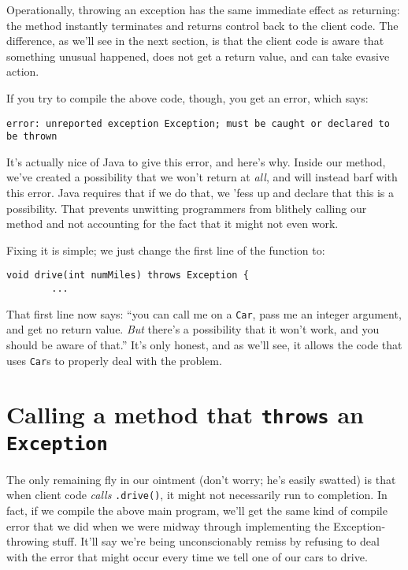 Operationally, throwing an exception has the same immediate effect as
returning: the method instantly terminates and returns control back to the
client code. The difference, as we'll see in the next section, is that the
client code is aware that something unusual happened, does not get a return
value, and can take evasive action.

If you try to compile the above code, though, you get an error, which says:

\begin{Verbatim}[samepage=true,fontsize=\footnotesize]
  error: unreported exception Exception; must be caught or declared to be thrown
\end{Verbatim}

It's actually nice of Java to give this error, and here's why. Inside our
method, we've created a possibility that we won't return at \textit{all}, and
will instead barf with this error. Java requires that if we do that, we 'fess
up and declare that this is a possibility. That prevents unwitting programmers
from blithely calling our method and not accounting for the fact that it might
not even work.

Fixing it is simple; we just change the first line of the function to:

\begin{Verbatim}[samepage=true,fontsize=\scriptsize,frame=single]
    void drive(int numMiles) throws Exception {
        ...
\end{Verbatim}

That first line now says: ``you can call me on a \texttt{Car}, pass me an
integer argument, and get no return value. \textit{But} there's a possibility
that it won't work, and you should be aware of that.'' It's only honest, and
as we'll see, it allows the code that uses \texttt{Car}s to properly deal with
the problem.


\section{Calling a method that \texttt{throws} an \texttt{Exception}}


The only remaining fly in our ointment (don't worry; he's easily swatted) is
that when client code \textit{calls} \texttt{.drive()}, it might not
necessarily run to completion. In fact, if we compile the above main program,
we'll get the same kind of compile error that we did when we were midway
through implementing the Exception-throwing stuff. It'll say we're being
unconscionably remiss by refusing to deal with the error that might occur
every time we tell one of our cars to drive.

